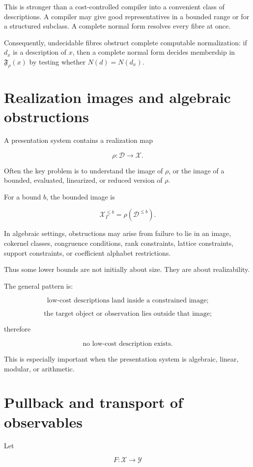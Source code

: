 \documentclass[11pt]{article}
\begin{document}
This is stronger than a cost-controlled compiler into a convenient class of descriptions. A compiler may give good representatives in a bounded range or for a structured subclass. A complete normal form resolves every fibre at once.

Consequently, undecidable fibres obstruct complete computable normalization: if \(d_x\) is a description of \(x\), then a complete normal form decides membership in \(\mathfrak F_\rho(x)\) by testing whether \(N(d)=N(d_x)\).


\section{Realization images and algebraic obstructions}

A presentation system contains a realization map

\[
\rho:\mathcal D\to\mathcal X.
\]

Often the key problem is to understand the image of \(\rho\), or the image of a bounded, evaluated, linearized, or reduced version of \(\rho\).

For a bound \(b\), the bounded image is

\[
\mathcal X_\Gamma^{\leq b}=\rho(\mathcal D^{\leq b}).
\]

In algebraic settings, obstructions may arise from failure to lie in an image, cokernel classes, congruence conditions, rank constraints, lattice constraints, support constraints, or coefficient alphabet restrictions.

Thus some lower bounds are not initially about size. They are about realizability.

The general pattern is:

\[
\text{low-cost descriptions land inside a constrained image;}
\]

\[
\text{the target object or observation lies outside that image;}
\]

therefore

\[
\text{no low-cost description exists.}
\]

This is especially important when the presentation system is algebraic, linear, modular, or arithmetic.


\section{Pullback and transport of observables}

Let

\[
F:\mathcal X\to\mathcal Y
\]
\end{document}
